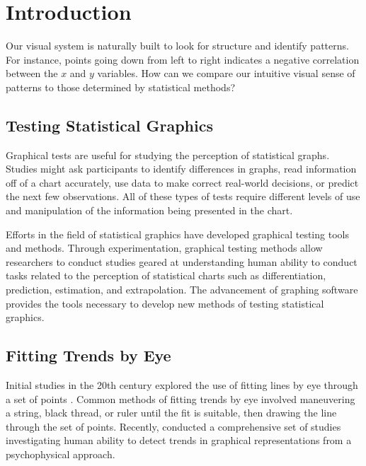 \documentclass[12pt]{article}
\begin{document}
\hypertarget{introduction}{%
\section{Introduction}\label{introduction}}

Our visual system is naturally built to look for structure and identify
patterns. For instance, points going down from left to right indicates a
negative correlation between the \(x\) and \(y\) variables. How can we
compare our intuitive visual sense of patterns to those determined by
statistical methods?

\hypertarget{testing-statistical-graphics}{%
\subsection{Testing Statistical
Graphics}\label{testing-statistical-graphics}}

Graphical tests are useful for studying the perception of statistical
graphs. Studies might ask participants to identify differences in
graphs, read information off of a chart accurately, use data to make
correct real-world decisions, or predict the next few observations. All
of these types of tests require different levels of use and manipulation
of the information being presented in the chart.

Efforts in the field of statistical graphics have developed graphical
testing tools and methods. Through experimentation, graphical testing
methods allow researchers to conduct studies geared at understanding
human ability to conduct tasks related to the perception of statistical
charts such as differentiation, prediction, estimation, and
extrapolation. The advancement of graphing software provides the tools
necessary to develop new methods of testing statistical graphics.

\hypertarget{fitting-trends-by-eye}{%
\subsection{Fitting Trends by Eye}\label{fitting-trends-by-eye}}

Initial studies in the 20th century explored the use of fitting lines by
eye through a set of points
\citep{finney1951subjective, mosteller1981eye}. Common methods of
fitting trends by eye involved maneuvering a string, black thread, or
ruler until the fit is suitable, then drawing the line through the set
of points. Recently, \citet{ciccione2021can} conducted a comprehensive
set of studies investigating human ability to detect trends in graphical
representations from a psychophysical approach.
\end{document}
